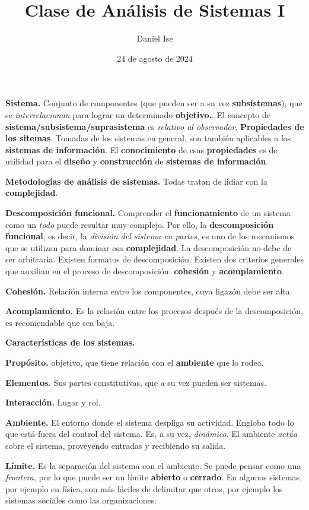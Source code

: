 \documentclass{article}
\title{Clase de Análisis de Sistemas I}
\author{Daniel Ise}
\date{24 de agosto de 2024}
\begin{document}
\maketitle

\textbf{Sistema.} Conjunto de componentes (que pueden ser a su vez
\textbf{subsistemas}), que se \textit{interrelacionan} para lograr un
determinado \textbf{objetivo.}.
El concepto de \textbf{sistema/subsistema/suprasistema} es
\textit{relativo al observador}.
\textbf{Propiedades de los sitemas}. Tomadas de los sistemas en general, son
también aplicables a los \textbf{sistemas de información}. El
\textbf{conocimiento} de esas \textbf{propiedades} es de utilidad para el
\textbf{diseño} y \textbf{construcción} de \textbf{sistemas de información}.

\textbf{Metodologías de análisis de sistemas.} Todas tratan de lidiar con la 
\textbf{complejidad}.

\textbf{Descomposición funcional.} Comprender el \textbf{funcionamiento} de un 
sistema como un \textit{todo} puede resultar muy complejo. Por ello, la
\textbf{descomposición funcional}, es decir, la
\textit{división del sistema en partes}, es uno de los mecanismos que se
utilizan para dominar esa \textbf{complejidad}. La descomposición no debe de ser
arbitraria. Existen formatos de descomposición. Existen dos criterios generales
que auxilian en el proceso de descomposición: \textbf{cohesión} y 
\textbf{acomplamiento}.

\textbf{Cohesión.} Relación interna entre los componentes, cuya ligazón debe ser
alta.

\textbf{Acomplamiento.} Es la relación entre los procesos después de la 
descomposición, es recomendable que sea baja. 

\textbf{Características de los sistemas.} 

\textbf{Propósito.} objetivo, que tiene relación con el \textbf{ambiente} que lo
rodea. 

\textbf{Elementos.} Sus partes constitutivas, que a su vez pueden ser sistemas.

\textbf{Interacción.} Lugar y rol.

\textbf{Ambiente.} El entorno donde el sistema despliga su actividad. Engloba
todo lo que está fuera del control del sistema. Es, a su vez, \textit{dinámico}.
El ambiente \textit{actúa} sobre el sistema, proveyendo entradas y recibiendo su
salida.

\textbf{Límite.} Es la separación del sistema con el ambiente. Se puede pensar 
como una \textit{frontera}, por lo que puede ser un límite \textbf{abierto} o 
\textbf{cerrado}. En algunos sistemas, por ejemplo en física, son más fáciles de
delimitar que otros, por ejemplo los sistemas sociales como las organizaciones.
\end{document}
